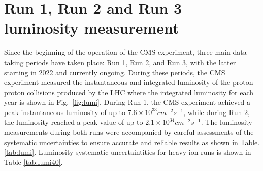 \section{Run 1, Run 2 and Run 3 luminosity measurement}

Since the beginning of the operation of the CMS experiment, three main data-taking periods have taken place: Run 1, Run 2, and Run 3, with the latter starting in 2022 and currently ongoing. During these periods, the CMS experiment measured the instantaneous and integrated luminosity of the proton-proton collisions produced by the LHC where the integrated luminosity for each year is shown in Fig.~\ref{fig:lumi}. During Run 1, the CMS experiment achieved a peak instantaneous luminosity of up to $7.6 \times 10^{33} cm^{-2} s^{-1}$, while during Run 2, the luminosity reached a peak value of up to $2.1 \times 10^{34} cm^{-2} s^{-1}$. The luminosity measurements during both runs were accompanied by careful assessments of the systematic uncertainties to ensure accurate and reliable results \cite{CMS-PAS-EWK-10-004, CMS-PAS-EWK-11-001, CMS-PAS-SMP-12-008, CMS-PAS-LUM-13-001, Sirunyan:2759951, pas_17, pas_18} as shown in Table. \ref{tab:lumi}. Luminosity systematic uncertaintities for heavy ion runs is shown in Table \ref{tab:lumi40}.


